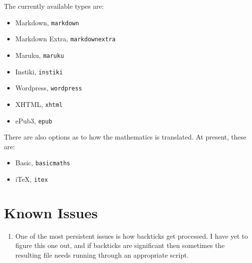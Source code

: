 \documentclass[github,text]{internet}
\begin{document}
The currently available types are:

\begin{itemize}
\item Markdown, \verb+markdown+
\item Markdown Extra, \verb+markdownextra+
\item Maruku, \verb+maruku+
\item Instiki, \verb+instiki+
\item Wordpress, \verb+wordpress+
\item XHTML, \verb+xhtml+
\item ePub3, \verb+epub+
\end{itemize}

There are also options as to how the mathematics is translated.
At present, these are:

\begin{itemize}
\item Basic, \verb+basicmaths+
\item iTeX, \verb+itex+
\end{itemize}

\section{Known Issues}

\begin{enumerate}
\item One of the most persistent issues is how backticks get processed.
I have yet to figure this one out, and if backticks are significant then sometimes the resulting file needs running through an appropriate script.
\end{enumerate}
\end{document}
